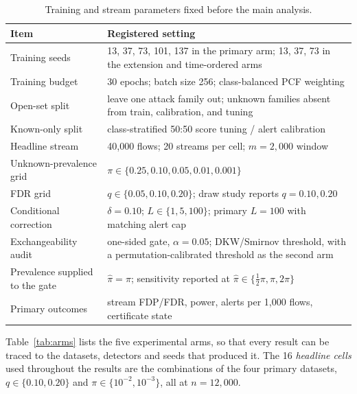 \documentclass[a4paper,fleqn]{cas-dc}
\begin{document}
\begin{table}[t]
\centering
\caption{Training and stream parameters fixed before the main analysis.}
\label{tab:protocol}
\small
\begin{tabularx}{\linewidth}{L{0.62}L{1.38}}
\toprule
Item & Registered setting \\
\midrule
Training seeds & 13, 37, 73, 101, 137 in the primary arm; 13, 37, 73 in the extension and time-ordered arms \\
Training budget & 30 epochs; batch size 256; class-balanced PCF weighting \\
Open-set split & leave one attack family out; unknown families absent from train, calibration, and tuning \\
Known-only split & class-stratified 50:50 score tuning / alert calibration \\
Headline stream & 40,000 flows; 20 streams per cell; $m=2{,}000$ window \\
Unknown-prevalence grid & $\pi\in\{0.25,0.10,0.05,0.01,0.001\}$ \\
FDR grid & $q\in\{0.05,0.10,0.20\}$; draw study reports $q=0.10,0.20$ \\
Conditional correction & $\delta=0.10$; $L\in\{1,5,100\}$; primary $L=100$ with matching alert cap \\
Exchangeability audit & one-sided gate, $\alpha=0.05$; DKW/Smirnov threshold, with a permutation-calibrated threshold as the second arm \\
Prevalence supplied to the gate & $\hat\pi=\pi$; sensitivity reported at $\hat\pi\in\{\tfrac12\pi,\pi,2\pi\}$ \\
Primary outcomes & stream FDP/FDR, power, alerts per 1,000 flows, certificate state \\
\bottomrule
\end{tabularx}
\end{table}

Table~\ref{tab:arms} lists the five experimental arms, so that every result can be traced to the datasets, detectors and seeds that produced it. The 16 \emph{headline cells} used throughout the results are the combinations of the four primary datasets, $q\in\{0.10,0.20\}$ and $\pi\in\{10^{-2},10^{-3}\}$, all at $n=12{,}000$.
\end{document}
